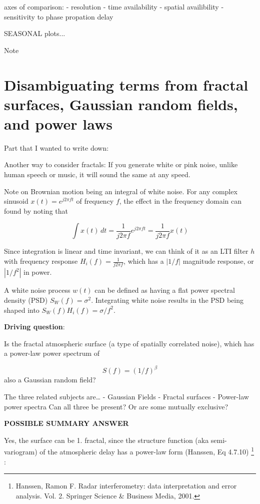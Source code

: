 \documentclass{utexasthesis}
\begin{document}
 axes of comparison:
 - resolution
 - time availability
 - spatial availibility
 - sensitivity to phase propation delay
 
 
 SEASONAL plots...
 
 Note

\section{Disambiguating terms from fractal surfaces, Gaussian random
fields, and power
laws}
\label{disambiguating-terms-from-fractal-surfaces-gaussian-random-fields-and-power-laws}

Part that I wanted to write down:

Another way to consider fractals: If you generate white or pink noise, unlike human speech or music, it will sound the same at any speed.

Note on Brownian motion being an integral of white noise.
For any complex sinusoid $x(t) = e^{j2 \pi f t}$ of frequency $f$, the effect in the frequency domain can found by noting that 

\begin{equation}
\int x(t) \, dt = \frac{1}{j 2 \pi f} e^{j2\pi f t} = \frac{1}{j 2 \pi f} x(t)
\end{equation}

Since integration is linear and time invariant, we can think of it as an LTI filter $h$ with frequency response $H_i(f) = \frac{1}{j 2 \pi f} $, which has a $|1/f|$ magnitude response, or $|1/f^2|$ in power.

A white noise process $w(t)$ can be defined as having a flat power spectral density (PSD) $S_W(f) = \sigma^2$. Integrating white noise results in the PSD being shaped into $S_W(f) H_i(f) = \sigma / f^2$.

\textbf{Driving question}:

Is the fractal atmospheric surface (a type of spatially correlated
noise), which has a power-law power spectrum of

\[S(f) = (1/f)^{\beta}\] also a Gaussian random field?

The three related subjects are\ldots{} - Gaussian Fields - Fractal
surfaces - Power-law power spectra Can all three be present? Or are some
mutually exclusive?

\textbf{POSSIBLE SUMMARY ANSWER}

Yes, the surface can be 1. fractal, since the structure function (aka
semi-variogram) of the atmospheric delay has a power-law form (Hanssen,
Eq 4.7.10) \footnote{Hanssen, Ramon F. Radar interferometry: data
  interpretation and error analysis. Vol. 2. Springer Science \&
  Business Media, 2001.} :
\end{document}
